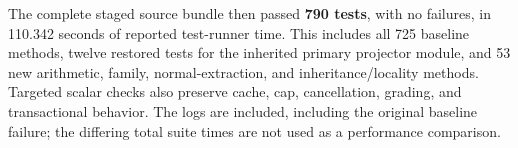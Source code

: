 The complete staged source bundle then passed \textbf{790 tests}, with no
failures, in 110.342 seconds of reported test-runner time. This includes all
725 baseline methods, twelve restored tests for the inherited primary
projector module, and 53 new arithmetic, family, normal-extraction, and
inheritance/locality methods. Targeted scalar checks also preserve cache,
cap, cancellation, grading, and transactional behavior. The logs are
included, including the original baseline failure; the differing total
suite times are not used as a performance comparison.
